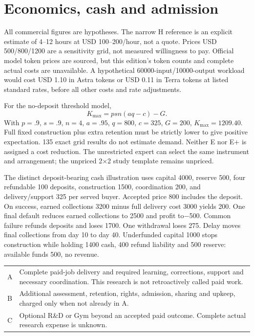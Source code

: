 \documentclass[10 pt]{article}
\begin{document}
\section{Economics, cash and admission}

All commercial figures are hypotheses. The narrow H reference is an explicit estimate of 4–12 hours at USD 100–200/hour, not a quote. Prices USD 500/800/1200 are a sensitivity grid, not measured willingness to pay. Official model token prices are sourced, but this edition's token counts and complete actual costs are unavailable. A hypothetical 60000-input/10000-output workload would cost USD 1.10 in Astra tokens or USD 0.11 in Terra tokens at listed standard rates, before all other costs and rate adjustments.

For the no-deposit threshold model,
\[
K_{\max}=psn(aq-c)-G.
\]
With $p=.9$, $s=.9$, $n=4$, $a=.95$, $q=800$, $c=325$, $G=200$, $K_{\max}=1209.40$. Full fixed construction plus extra retention must be strictly lower to give positive expectation. 135 exact grid results do not estimate demand. Neither E nor E+ is assigned a cost reduction. The unrestricted expert can select the same instrument and arrangement; the unpriced 2×2 study template remains unpriced.

The distinct deposit-bearing cash illustration uses capital 4000, reserve 500, four refundable 100 deposits, construction 1500, coordination 200, and delivery/support 325 per served buyer. Accepted price 800 includes the deposit. On success, earned collections 3200 minus full delivery cost 3000 yields 200. One final default reduces earned collections to 2500 and profit to−500. Common failure refunds deposits and loses 1700. One withdrawal loses 275. Delay moves final collections from day 10 to day 40. Underfunded capital 1000 stops construction while holding 1400 cash, 400 refund liability and 500 reserve: available funds 500, no revenue.

\begin{tabularx}{\textwidth}{lY}
\toprule
A &Complete paid-job delivery and required learning, corrections, support and necessary coordination. This research is not retroactively called paid work.\\
B &Additional assessment, retention, rights, admission, sharing and upkeep, charged only when not already in A.\\
C &Optional R\&D or Gym beyond an accepted paid outcome. Complete actual research expense is unknown.\\
\bottomrule
\end{tabularx}
\end{document}
